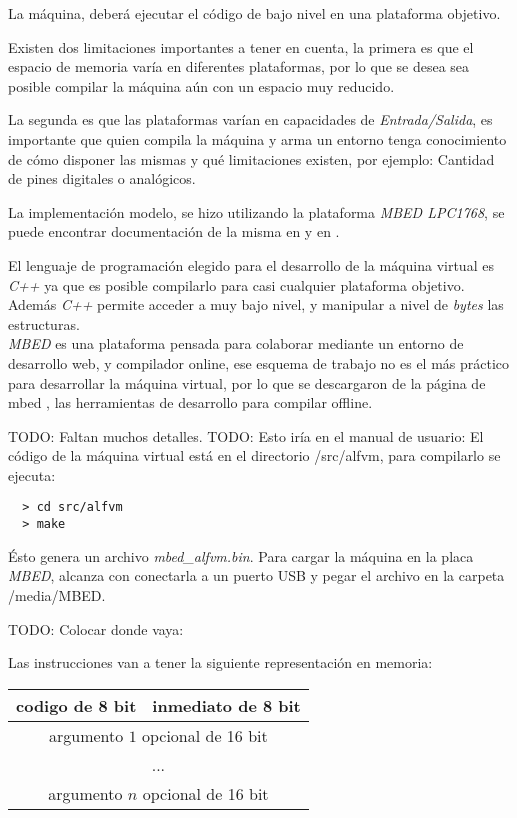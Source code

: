   La máquina, deberá ejecutar el código de bajo nivel en una plataforma
  objetivo.

  Existen dos limitaciones importantes a tener en cuenta, la primera es que
el espacio de memoria varía en diferentes plataformas, por lo que se desea
sea posible compilar la máquina aún con un espacio muy reducido.

  La segunda es que las plataformas varían en capacidades
de \textit{Entrada/Salida}, es importante que quien compila la máquina y
arma un entorno tenga conocimiento de cómo disponer las mismas y qué
limitaciones existen, por ejemplo: Cantidad de pines digitales o analógicos.

  La implementación modelo, se hizo utilizando
  la plataforma \textit{MBED LPC1768},
se puede encontrar documentación de la misma en \cite{mbed-LPC1768} 
y en \cite{mbed}.

  El lenguaje de programación elegido para el desarrollo de la máquina virtual
es \textit{C++} ya que es posible compilarlo para casi cualquier plataforma
objetivo.
  Además \textit{C++} permite acceder a muy bajo nivel, y manipular a
nivel de \emph{bytes} las estructuras.\\

  \textit{MBED} es una plataforma pensada para colaborar mediante
un entorno de desarrollo web, y compilador online, ese esquema de 
trabajo no es el más práctico para desarrollar la máquina virtual, por
lo que se descargaron de la página de mbed \cite{mbeddev}, las herramientas
de desarrollo para compilar offline.

TODO: Faltan muchos detalles.
TODO: Esto iría en el manual de usuario:
  El código de la máquina virtual está en el directorio
  /src/alfvm, para compilarlo se ejecuta:

\begin{verbatim}
  > cd src/alfvm
  > make
\end{verbatim}

  Ésto genera un archivo \emph{mbed\_alfvm.bin}.
  Para cargar la máquina en la placa \textit{MBED}, alcanza con conectarla
a un puerto USB y pegar el archivo en la carpeta /media/MBED.


 
  TODO: Colocar donde vaya:

  Las instrucciones van a tener la siguiente representación en memoria:

  \begin{center}
      \begin{tabular}{|c|c|}
      \hline
      codigo de 8 bit & \cellcolor{gray!25}inmediato de 8 bit \\
      \hline
      \multicolumn{2}{|c|}{argumento $1$ opcional de 16 bit} \\
      \hline
      \multicolumn{2}{|c|}{...} \\
      \hline
      \multicolumn{2}{|c|}{argumento $n$ opcional de 16 bit} \\
      \hline
      \end{tabular}
  \end{center}


